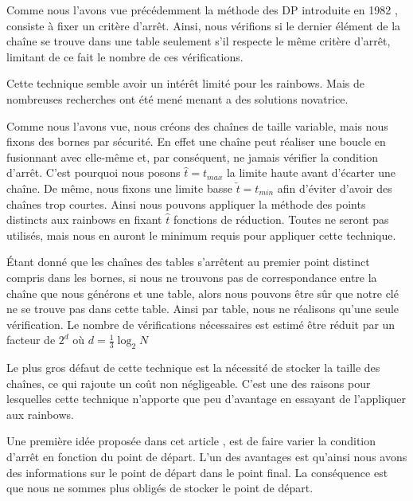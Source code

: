 	Comme nous l'avons vue précédemment la méthode des \acrfull{DP} introduite en 1982 \cite{Rivest}, consiste à fixer un critère d'arrêt. Ainsi, nous vérifions si le dernier élément de la chaîne se trouve dans une table seulement s'il respecte le même critère d'arrêt, limitant de ce fait le nombre de ces vérifications.

	\bigskip

	Cette technique semble avoir un intérêt limité pour les \glspl{rainbow}. Mais de nombreuses recherches ont été mené menant a des solutions novatrice.

	\bigskip


		Comme nous l'avons vue, nous créons des chaînes de taille variable, mais nous fixons des bornes par sécurité. En effet une chaîne peut réaliser une boucle en fusionnant avec elle-même et, par conséquent, ne jamais vérifier la condition d'arrêt. C'est pourquoi nous posons $\hat{t}=t_{max}$ la limite haute avant d'écarter une chaîne. De même, nous fixons une limite basse $\check{t}=t_{min}$ afin d'éviter d'avoir des chaînes trop courtes. Ainsi nous pouvons appliquer la méthode des points distincts aux \glspl{rainbow} en fixant $\hat{t}$ fonctions de réduction. Toutes ne seront pas utilisés, mais nous en auront le minimum requis pour appliquer cette technique.

		\bigskip

		Étant donné que les chaînes des tables s'arrêtent au premier point distinct compris dans les bornes, si nous ne trouvons pas de correspondance entre la chaîne que nous générons et une table, alors nous pouvons être sûr que notre clé ne se trouve pas dans cette table. Ainsi par table, nous ne réalisons qu'une seule vérification. Le nombre de vérifications nécessaires est estimé être réduit par un facteur de $2^d$ où $d=\frac{1}{3}\log_2 N$

		\bigskip

		Le plus gros défaut de cette technique est la nécessité de stocker la taille des chaînes, ce qui rajoute un coût non négligeable. C'est une des raisons pour lesquelles cette technique n'apporte que peu d'avantage en essayant de l'appliquer aux \glspl{rainbow}.

		\bigskip


		Une première idée proposée dans cet article \cite{VDP}, est de faire varier la condition d'arrêt en fonction du point de départ. L'un des avantages est qu'ainsi nous avons des informations sur le point de départ dans le point final. La conséquence est que nous ne sommes plus obligés de stocker le point de départ.

